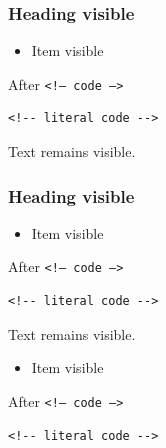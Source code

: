 \begin{frame}[t]
\frametitle{Heading  %
visible}

\end{frame}

\begin{frame}[t,fragile]
\begin{itemize}
\item Item  %
visible
\end{itemize}
After
\texttt{<!-- code -->}
\begin{verbatim}
<!-- literal code -->
\end{verbatim}
\end{frame}

\begin{frame}[t]
%
%
%
Text  %
remains visible.
\end{frame}

\begin{frame}[t,fragile]
\frametitle{Heading  %
visible}
\begin{itemize}
\item Item  %
visible
\end{itemize}
After
\texttt{<!-- code -->}
\begin{verbatim}
<!-- literal code -->
\end{verbatim}
\end{frame}

\begin{frame}[t,fragile]
%
%
%
Text  %
remains visible.
\begin{itemize}
\item Item  %
visible
\end{itemize}
After
\texttt{<!-- code -->}
\begin{verbatim}
<!-- literal code -->
\end{verbatim}
\end{frame}

